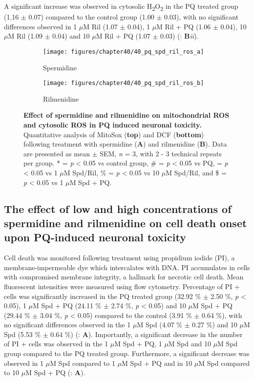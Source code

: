 A significant increase was observed in cytosolic H\textsubscript{2}O\textsubscript{2} in the PQ treated group (1.16 $\pm$ 0.07) compared to the control group (1.00 $\pm$ 0.03), with no significant differences observed in 1 $\mu$M Ril (1.07 $\pm$ 0.04), 1 $\mu$M Ril + PQ (1.06 $\pm$ 0.04), 10 $\mu$M Ril (1.09 $\pm$ 0.04) and 10 $\mu$M Ril + PQ (1.07 $\pm$ 0.03) (: \textbf{B}\textit{ii}).

\begin{figure}[!htbp]
  \center
  \begin{subfigure}[b]{0.495\linewidth}
    \texttt{[image: figures/chapter40/40\_pq\_spd\_ril\_ros\_a]}
    \caption{Spermidine}
  \end{subfigure}
  \begin{subfigure}[b]{0.495\linewidth}
    \texttt{[image: figures/chapter40/40\_pq\_spd\_ril\_ros\_b]}
    \caption{Rilmenidine}
  \end{subfigure}
  \caption[Effect of spermidine and rilmenidine on mitochondrial ROS and cytosolic ROS in PQ induced neuronal toxicity]{\textbf{Effect of spermidine and rilmenidine on mitochondrial ROS and cytosolic ROS in PQ induced neuronal toxicity.} Quantitative analysis of MitoSox (\textbf{top}) and DCF (\textbf{bottom}) following treatment with spermidine (\textbf{A}) and rilmenidine (\textbf{B}). Data are presented as mean $\pm$ SEM, \textit{n} = 3, with 2 - 3 technical repeats per group. * = \textit{p} < 0.05 vs control group, \# = \textit{p} < 0.05 vs PQ, \@ = \textit{p} < 0.05 vs 1 $\mu$M Spd/Ril, \% = \textit{p} < 0.05 vs 10 $\mu$M Spd/Ril, and \$ = \textit{p} < 0.05 vs 1 $\mu$M Spd + PQ.}
  \label{fig:40_pq_spd_ril_ros_a}
\end{figure} 

\subsection{The effect of low and high concentrations of spermidine and rilmenidine on cell death onset upon PQ-induced neuronal toxicity} 
Cell death was monitored following treatment using propidium iodide (PI), a membrane-impermeable dye which intercalates with DNA. PI accumulates in cells with compromised membrane integrity, a hallmark for necrotic cell death. Mean fluorescent intensities were measured using flow cytometry. Percentage of PI + cells was significantly increased in the PQ treated group (32.92 \% $\pm$ 2.50 \%, \textit{p} < 0.05), 1 $\mu$M Spd + PQ (24.11 \% $\pm$ 2.74 \%, \textit{p} < 0.05) and 10 $\mu$M Spd + PQ (29.44 \% $\pm$ 3.04 \%, \textit{p} < 0.05) compared to the control (3.91 \% $\pm$ 0.64 \%), with no significant differences observed in the 1 $\mu$M Spd (4.07 \% $\pm$ 0.27 \%) and 10 $\mu$M Spd (5.53 \% $\pm$ 0.64 \%) (: \textbf{A}). Importantly, a significant decrease in the number of PI + cells was observed in the 1 $\mu$M Spd + PQ, 1 $\mu$M Spd and 10 $\mu$M Spd group compared to the PQ treated group. Furthermore, a significant decrease was observed in 1 $\mu$M Spd compared to 1 $\mu$M Spd + PQ and in 10 $\mu$M Spd compared to 10 $\mu$M Spd + PQ (: \textbf{A}).

